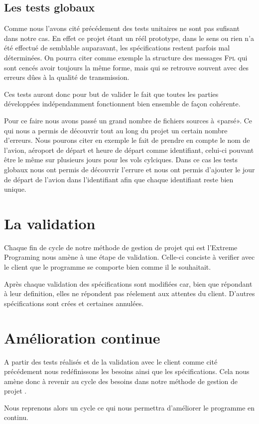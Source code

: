     \subsection{Les tests globaux}
Comme nous l'avons cité précédement des tests unitaires ne sont pas sufisant dans notre cas. En effet ce projet étant un réél prototype, dans le sens ou rien n'a été effectué de semblable auparavant, les spécifications restent parfois mal déterminées. On pourra citer comme exemple la structure des messages \textsc{Fpl} qui sont cencés avoir toujours la même forme, mais qui se retrouve souvent avec des erreurs dûes à la qualité de transmission.

Ces tests auront donc pour but de valider le fait que toutes les parties développées indépendamment fonctionnent bien ensemble de façon cohérente.

Pour ce faire nous avons passé un grand nombre de fichiers sources à «parsé». Ce qui nous a permis de découvrir tout au long du projet un certain nombre d'erreurs. Nous pourons citer en exemple le fait de prendre en compte le nom de l'avion, aéroport de départ et heure de départ comme identifiant, celui-ci pouvant être le même sur plusieurs jours pour les vols cylciques. Dans ce cas les tests globaux nous ont permis de découvrir l'errure et nous ont permis d'ajouter le jour de départ de l'avion dans l'identifiant afin que chaque identifiant reste bien unique.

\section{La validation}
Chaque fin de cycle de notre méthode de gestion de projet qui est l'Extreme Programing nous amène à une étape de validation. Celle-ci conciste à verifier avec le client que le programme se comporte bien comme il le souhaitait.

Après chaque validation des spécifications sont modifiées car, bien que répondant à leur definition, elles ne répondent pas réelement aux attentes du client. D'autres spécifications sont crées et certaines annulées.

\section{Amélioration continue}
A partir des tests réalisés et de la validation avec le client comme cité précédement nous redéfinissons les besoins ainsi que les spécifications. Cela nous amène donc à revenir au cycle des besoins  dans notre méthode de gestion de projet .

Nous reprenons alors un cycle ce qui nous permettra d'améliorer le programme en continu.


